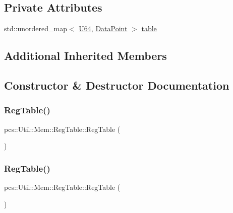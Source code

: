 \subsection*{Private Attributes}
\begin{DoxyCompactItemize}
\item 
std\+::unordered\+\_\+map$<$ \hyperlink{namespacepcs_1_1Util_1_1Mem_ab390aefcd13d26db4db397b784b4b9c6}{U64}, \hyperlink{structpcs_1_1Util_1_1Mem_1_1DataPoint}{Data\+Point} $>$ \hyperlink{classpcs_1_1Util_1_1Mem_1_1RegTable_a00dba5deb5b8f0b1ce83dc1f90a2187f}{table}
\end{DoxyCompactItemize}
\subsection*{Additional Inherited Members}


\subsection{Constructor \& Destructor Documentation}
\mbox{\label{classpcs_1_1Util_1_1Mem_1_1RegTable_abf5ce566d2af0fa1267ff19e24bf8912}} 
\subsubsection{\texorpdfstring{Reg\+Table()}{RegTable()}\hspace{0.1cm}{\footnotesize\ttfamily [1/2]}}
{\footnotesize\ttfamily pcs\+::\+Util\+::\+Mem\+::\+Reg\+Table\+::\+Reg\+Table (\begin{DoxyParamCaption}{ }\end{DoxyParamCaption})\hspace{0.3cm}{\ttfamily [inline]}}

\mbox{\label{classpcs_1_1Util_1_1Mem_1_1RegTable_a665bb13c8159497d6ccf30aefb525681}} 
\subsubsection{\texorpdfstring{Reg\+Table()}{RegTable()}\hspace{0.1cm}{\footnotesize\ttfamily [2/2]}}
{\footnotesize\ttfamily pcs\+::\+Util\+::\+Mem\+::\+Reg\+Table\+::\+Reg\+Table (\begin{DoxyParamCaption}\item[{const \hyperlink{classpcs_1_1Util_1_1Mem_1_1RegTable}{Reg\+Table} \&}]{ }\end{DoxyParamCaption})\hspace{0.3cm}{\ttfamily [delete]}}



